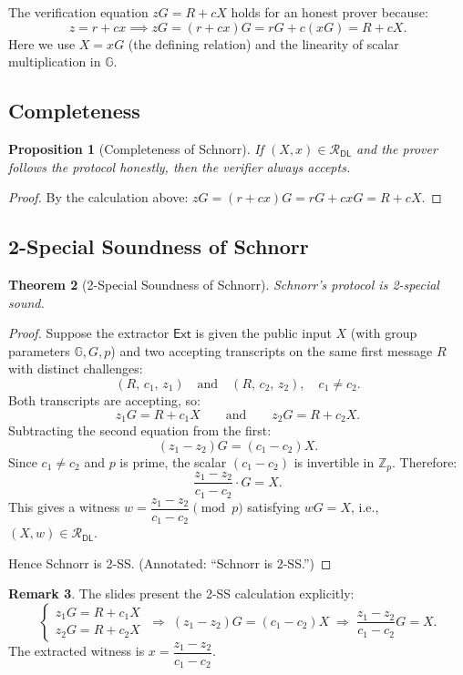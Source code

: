 \documentclass[11pt]{article}
\theoremstyle{plain}
\newtheorem{theorem}{Theorem}[section]
\newtheorem{proposition}[theorem]{Proposition}
\theoremstyle{definition}
\newtheorem{remark}[theorem]{Remark}
\newcommand{\Zp}{\mathbb{Z}_p}
\begin{document}
The verification equation $zG = R + cX$ holds for an honest prover because:
\[
  z = r + cx
  \implies
  zG = (r + cx)G = rG + c(xG) = R + cX.
\]
Here we use $X = xG$ (the defining relation) and the linearity of scalar multiplication in $\mathbb{G}$.

\subsection{Completeness}

\begin{proposition}[Completeness of Schnorr]
If $(X, x) \in \mathcal{R}_{\mathsf{DL}}$ and the prover follows the protocol honestly, then the verifier always accepts.
\end{proposition}

\begin{proof}
By the calculation above: $zG = (r + cx)G = rG + cxG = R + cX$.
\end{proof}

\subsection{2-Special Soundness of Schnorr}

\begin{theorem}[2-Special Soundness of Schnorr]
Schnorr's protocol is 2-special sound.
\end{theorem}

\begin{proof}
Suppose the extractor $\mathsf{Ext}$ is given the public input $X$ (with group parameters $\mathbb{G}, G, p$) and two accepting transcripts on the same first message $R$ with distinct challenges:
\[
  (R,\, c_1,\, z_1) \quad \text{and} \quad (R,\, c_2,\, z_2), \quad c_1 \neq c_2.
\]
Both transcripts are accepting, so:
\[
  z_1 G = R + c_1 X \qquad \text{and} \qquad z_2 G = R + c_2 X.
\]
Subtracting the second equation from the first:
\[
  (z_1 - z_2)G = (c_1 - c_2)X.
\]
Since $c_1 \neq c_2$ and $p$ is prime, the scalar $(c_1 - c_2)$ is invertible in $\Zp$. Therefore:
\[
  \frac{z_1 - z_2}{c_1 - c_2} \cdot G = X.
\]
This gives a witness $w = \dfrac{z_1 - z_2}{c_1 - c_2} \pmod{p}$ satisfying $wG = X$, i.e., $(X, w) \in \mathcal{R}_{\mathsf{DL}}$.

Hence Schnorr is 2-SS. \qquad (Annotated: ``Schnorr is 2-SS.'')
\end{proof}

\begin{remark}
The slides present the 2-SS calculation explicitly:
\[
  \begin{cases} z_1 G = R + c_1 X \\ z_2 G = R + c_2 X \end{cases}
  \;\Rightarrow\;
  (z_1 - z_2)G = (c_1 - c_2)X
  \;\Rightarrow\;
  \frac{z_1 - z_2}{c_1 - c_2} G = X.
\]
The extracted witness is $x = \dfrac{z_1 - z_2}{c_1 - c_2}$.
\end{remark}
\end{document}
